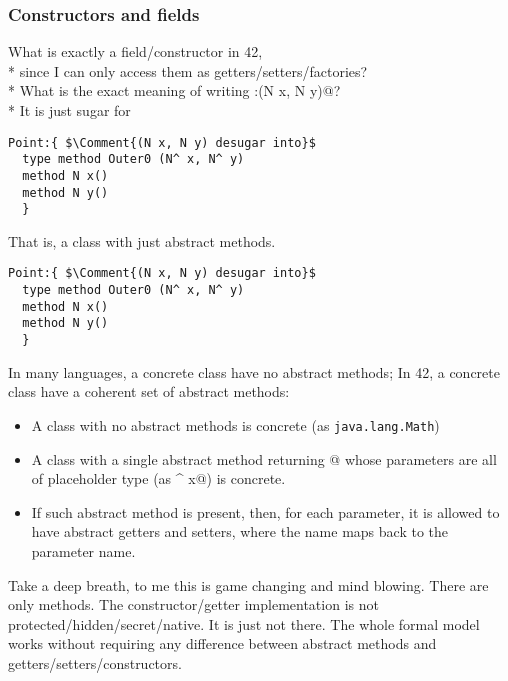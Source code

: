 \begin{frame}[fragile]
\frametitle{Constructors and fields}

%      

\pause What is exactly a field/constructor in 42,
${}_{}$\\*
\pause since I can only
access them as getters/setters/factories?
${}_{}$\\*
\pause What is the exact meaning of writing
\Q@Point:{(N x, N y)}@?
${}_{}$\\*
\pause
It is just sugar for 
\begin{NiceCode}{59ex}{1}
\begin{lstlisting}
Point:{ $\Comment{(N x, N y) desugar into}$
  type method Outer0 (N^ x, N^ y)
  method N x()
  method N y()
  }
\end{lstlisting}
\end{NiceCode}

That is, a class with just abstract methods.
\end{frame}


\begin{frame}[fragile]
\begin{NiceCode}{59ex}{1}
\begin{lstlisting}
Point:{ $\Comment{(N x, N y) desugar into}$
  type method Outer0 (N^ x, N^ y)
  method N x()
  method N y()
  }
\end{lstlisting}
\end{NiceCode}
\pause In many languages, a concrete class have no abstract methods;
In 42, a concrete class have a \alert{coherent set} of abstract methods:
\begin{itemize}
\pause\item A class with no abstract methods is concrete {\small(as {\texttt{java.lang.Math}})}
\pause\item A class with a single abstract \Q@type@ method returning @
whose parameters are all of placeholder type (as \Q@N^ x@) is concrete.
\pause\item If such abstract \Q@type@ method is present, then, for each parameter,
it is allowed to have abstract getters and setters,
where the name maps back to the parameter name.
\end{itemize}
\pause
Take a deep breath, to me this is game changing and mind blowing.
There are only methods. The constructor/getter implementation is not
protected/hidden/secret/native. It is just \alert{not there}.
\pause The whole formal model works without requiring any difference between abstract methods
and getters/setters/constructors.

\end{frame}

